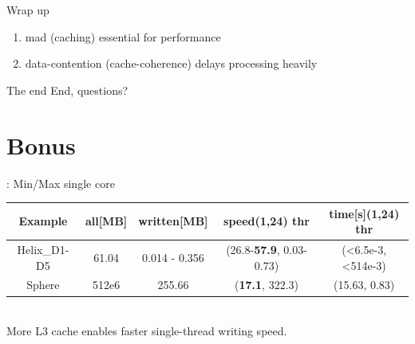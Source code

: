 \documentclass{beamer}
\begin{document}
\begin{frame}{Wrap up}
  \centering
  \begin{enumerate}
    \item \ac{mad} (caching) essential for performance
    \item data-contention (cache-coherence) delays processing heavily
    \end{enumerate}
\end{frame}
\begin{frame}{The end}
  \centering
  End, questions?
\end{frame}
\section{Bonus}%
\begin{frame}{\insertsection : Min/Max single core}
  \centering
  {
    \small
  \begin{tabularx}{\textwidth}{@{}c@{}|@{}c@{}|@{}c@{}|@{}c@{}|@{}c@{}}
  \textbf{Example} & \textbf{all}[MB] & \textbf{written}[MB] &
    \textbf{speed}(1,\textbf{24}) thr & \textbf{time}[s](1,\textbf{24}) thr\\
  \hline
    Helix\_D1-D5 & 61.04 &  0.014 - 0.356 & (26.8-\textbf{57.9}, 0.03-0.73) & (<6.5e-3,<514e-3)\\
    Sphere & 512e6 &  255.66 & (\textbf{17.1}, 322.3) & (15.63, 0.83)
  \end{tabularx}
  }
  \\
  \vspace{1cm}
  More L3 cache enables faster single-thread writing speed.
\end{frame}
\end{document}

